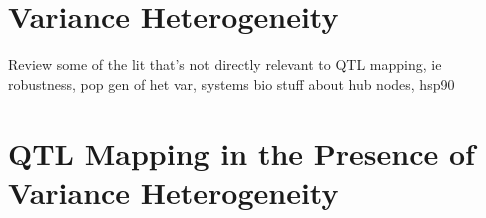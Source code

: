 \section{Variance Heterogeneity}


Review some of the lit that's not directly relevant to QTL mapping,
ie robustness, pop gen of het var, systems bio stuff about hub  nodes, hsp90







\section{QTL Mapping in the Presence of Variance Heterogeneity}


